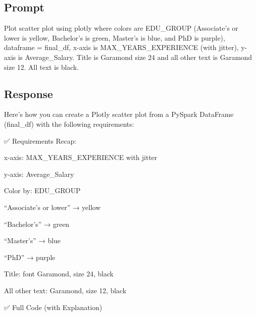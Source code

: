 \documentclass[
  letterpaper,
  DIV=11,
  numbers=noendperiod]{scrartcl}
\begin{document}
\subsection{Prompt}\label{prompt-5}

Plot scatter plot using plotly where colors are EDU\_GROUP (Associate's
or lower is yellow, Bachelor's is green, Master's is blue, and PhD is
purple), dataframe = final\_df, x-axis is MAX\_YEARS\_EXPERIENCE (with
jitter), y-axis is Average\_Salary. Title is Garamond size 24 and all
other text is Garamond size 12. All text is black.

\subsection{Response}\label{response-5}

Here's how you can create a Plotly scatter plot from a PySpark DataFrame
(final\_df) with the following requirements:

✅ Requirements Recap:

x-axis: MAX\_YEARS\_EXPERIENCE with jitter

y-axis: Average\_Salary

Color by: EDU\_GROUP

``Associate's or lower'' → yellow

``Bachelor's'' → green

``Master's'' → blue

``PhD'' → purple

Title: font Garamond, size 24, black

All other text: Garamond, size 12, black

✅ Full Code (with Explanation)
\end{document}
